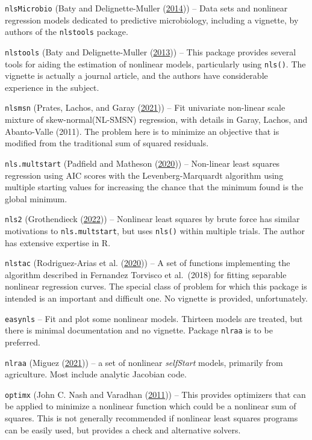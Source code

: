 \documentclass[
]{article}
\begin{document}
\texttt{nlsMicrobio} (Baty and Delignette-Muller
(\protect\hyperlink{ref-nlsMicrobio-manual}{2014})) -- Data sets and
nonlinear regression models dedicated to predictive microbiology,
including a vignette, by authors of the \texttt{nlstools} package.

\texttt{nlstools} (Baty and Delignette-Muller
(\protect\hyperlink{ref-p-nlstools}{2013})) -- This package provides
several tools for aiding the estimation of nonlinear models,
particularly using \texttt{nls()}. The vignette is actually a journal
article, and the authors have considerable experience in the subject.

\texttt{nlsmsn} (Prates, Lachos, and Garay
(\protect\hyperlink{ref-m-nlsmsn}{2021})) -- Fit univariate non-linear
scale mixture of skew-normal(NL-SMSN) regression, with details in Garay,
Lachos, and Abanto-Valle (2011). The problem here is to minimize an
objective that is modified from the traditional sum of squared
residuals.

\texttt{nls.multstart} (Padfield and Matheson
(\protect\hyperlink{ref-nlsmultstart}{2020})) -- Non-linear least
squares regression using AIC scores with the Levenberg-Marquardt
algorithm using multiple starting values for increasing the chance that
the minimum found is the global minimum.

\texttt{nls2} (Grothendieck (\protect\hyperlink{ref-nls2-22}{2022})) --
Nonlinear least squares by brute force has similar motivations to
\texttt{nls.multstart}, but uses \texttt{nls()} within multiple trials.
The author has extensive expertise in R.

\texttt{nlstac} (Rodriguez-Arias et al.
(\protect\hyperlink{ref-m-nlstac}{2020})) -- A set of functions
implementing the algorithm described in Fernandez Torvisco et al.~(2018)
for fitting separable nonlinear regression curves. The special class of
problem for which this package is intended is an important and difficult
one. No vignette is provided, unfortunately.

\texttt{easynls} -- Fit and plot some nonlinear models. Thirteen models
are treated, but there is minimal documentation and no vignette. Package
\texttt{nlraa} is to be preferred.

\texttt{nlraa} (Miguez (\protect\hyperlink{ref-MiguezNLRAA2021}{2021}))
-- a set of nonlinear \emph{selfStart} models, primarily from
agriculture. Most include analytic Jacobian code.

\texttt{optimx} (John C. Nash and Varadhan
(\protect\hyperlink{ref-p-optimx}{2011})) -- This provides optimizers
that can be applied to minimize a nonlinear function which could be a
nonlinear sum of squares. This is not generally recommended if nonlinear
least squares programs can be easily used, but provides a check and
alternative solvers.
\end{document}
